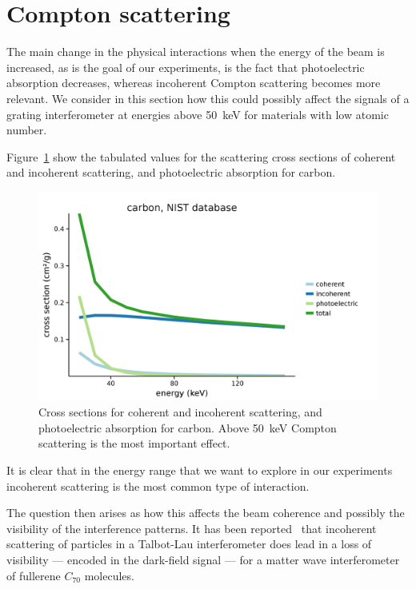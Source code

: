 \section{Compton scattering}
The main change in the physical interactions when the energy of the beam is
increased, as is the goal of our experiments, is the fact that photoelectric
absorption decreases, whereas incoherent Compton scattering becomes more
relevant. We consider in this section how this could possibly affect the
signals of a grating interferometer at energies above \SI{50}{\kilo\eV} for
materials with low atomic number.

Figure~\ref{fig:carbon-cross-sections} show the tabulated values for the
scattering cross sections of coherent and incoherent scattering, and
photoelectric absorption for carbon.

\begin{figure}[htb]
    \centering
    \includegraphics[width=\textwidth]{gfx/compton/carbon_cross_section.png}
    \caption{Cross sections for coherent and incoherent scattering, and
        photoelectric absorption for carbon. Above \SI{50}{\kilo\eV} Compton
    scattering is the most important effect.}
    \label{fig:carbon-cross-sections}
\end{figure}

It is clear that in the energy range that we want to explore in our
experiments incoherent scattering is the most common type of interaction.

The question then arises as how this affects the beam coherence and possibly
the visibility of the interference patterns. It has been
reported~\cite{PhysRevLett.90.160401} that incoherent scattering of
particles in a Talbot-Lau interferometer does lead in a loss of visibility
--- encoded in the dark-field signal --- for a matter wave interferometer of
fullerene $C_{70}$ molecules.

